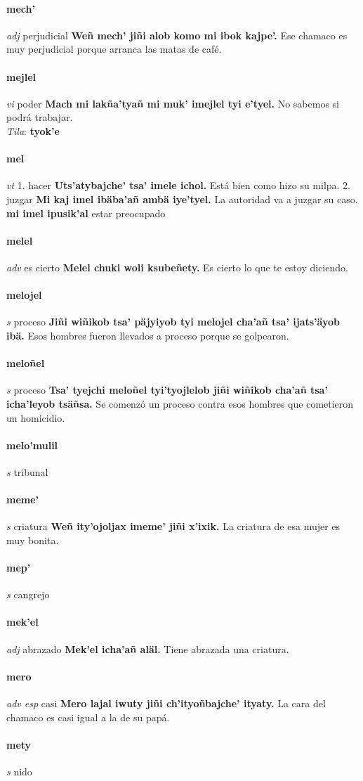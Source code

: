 \documentclass{scrbook}
\newcommand{\entry}[1]{\paragraph{#1}}
\newcommand{\onedefinition}[1]{#1.}
\newcommand{\partofspeech}[1]{\textit{#1}}
\newcommand{\spanishtranslation}[1]{#1}
\newcommand{\cholexample}[1]{\textbf{#1}}
\newcommand{\exampletranslation}[1]{#1}
\newcommand{\dialectvariant}[1]{\\\textit{#1}:}
\newcommand{\dialectword}[1]{\textbf{#1}}
\newcommand{\secondaryentry}[1]{\\\textbf{#1}}
\newcommand{\secondtranslation}[1]{#1}
\begin{document}
\begin{multicols}{2}
\entry{mech'}
\partofspeech{adj}
\spanishtranslation{perjudicial}
\cholexample{Weñ mech' jiñi alob komo mi ibok kajpe'.}
\exampletranslation{Ese chamaco es muy perjudicial porque arranca las matas de café.}

\entry{mejlel}
\partofspeech{vi}
\spanishtranslation{poder}
\cholexample{Mach mi lakña'tyañ mi muk' imejlel tyi e'tyel.}
\exampletranslation{No sabemos si podrá trabajar.}
\dialectvariant{Tila}
\dialectword{tyok'e}

\entry{mel}
\partofspeech{vt}
\onedefinition{1}
\spanishtranslation{hacer}
\cholexample{Uts'atybajche' tsa' imele ichol.}
\exampletranslation{Está bien como hizo su milpa.}
\onedefinition{2}
\spanishtranslation{juzgar}
\cholexample{Mi kaj imel ibäba'añ ambä iye'tyel.}
\exampletranslation{La autoridad va a juzgar su caso.}
\secondaryentry{mi imel ipusik'al}
\secondtranslation{estar preocupado}

\entry{melel}
\partofspeech{adv}
\spanishtranslation{es cierto}
\cholexample{Melel chuki woli ksubeñety.}
\exampletranslation{Es cierto lo que te estoy diciendo.}

\entry{melojel}
\partofspeech{s}
\spanishtranslation{proceso}
\cholexample{Jiñi wiñikob tsa' päjyiyob tyi melojel cha'añ tsa' ijats'äyob ibä.}
\exampletranslation{Esos hombres fueron llevados a proceso porque se golpearon.}

\entry{meloñel}
\partofspeech{s}
\spanishtranslation{proceso}
\cholexample{Tsa' tyejchi meloñel tyi'tyojlelob jiñi wiñikob cha'añ tsa' icha'leyob tsäñsa.}
\exampletranslation{Se comenzó un proceso contra esos hombres que cometieron un homicidio.}

\entry{melo'mulil}
\partofspeech{s}
\spanishtranslation{tribunal}

\entry{meme'}
\partofspeech{s}
\spanishtranslation{criatura}
\cholexample{Weñ ity'ojoljax imeme' jiñi x'ixik.}
\exampletranslation{La criatura de esa mujer es muy bonita.}

\entry{mep'}
\partofspeech{s}
\spanishtranslation{cangrejo}

\entry{mek'el}
\partofspeech{adj}
\spanishtranslation{abrazado}
\cholexample{Mek'el icha'añ aläl.}
\exampletranslation{Tiene abrazada una criatura.}

\entry{mero}
\partofspeech{adv esp}
\spanishtranslation{casi}
\cholexample{Mero lajal iwuty jiñi ch'ityoñbajche' ityaty.}
\exampletranslation{La cara del chamaco es casi igual a la de su papá.}

\entry{mety}
\partofspeech{s}
\spanishtranslation{nido}


\end{multicols}
\end{document}

